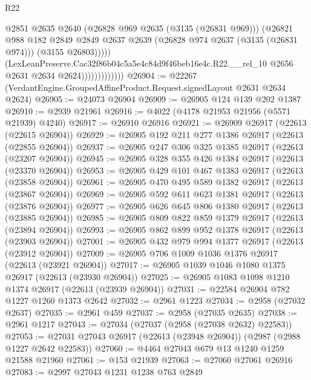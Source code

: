 \begin{lexlean}{R22}
\begin{coremodule}
                                  @2851
                                  @2635
                                  @2640
                                  (@26828 @969 @2635 (@3135 (@26831 @969)))
                                  (@26821
                                    @988
                                    @182
                                    @2849
                                    @2849
                                    @2637
                                    @2639
                                    (@26828 @974 @2637 (@3135 (@26831 @974)))
                                    (@3155 @26803)))))
                            (LexLeanPreserve.Cac32f86b04c5a5e4c84d9f46beb16e4c.R22.__rel_10
                              @2656
                              @2631
                              @2634
                              @2624)))))))))))))
@26904 := @22267 (VerdantEngine.GroupedAffineProduct.Request.signedLayout @2631 @2634 @2624)
@26905 := @24073 @26904
@26909 := @26905 @124 @139 @202 @1387
@26910 := @2939 @21961
@26916 := @4022 (@4178 @21953 @21956 (@5571 @21939) @4240)
@26917 := @26910 @26916
@26921 := @26909 @26917 (@22613 (@22615 @26904))
@26929 := @26905 @192 @211 @277 @1386 @26917 (@22613 (@22855 @26904))
@26937 := @26905 @247 @306 @325 @1385 @26917 (@22613 (@23207 @26904))
@26945 := @26905 @328 @355 @426 @1384 @26917 (@22613 (@23370 @26904))
@26953 := @26905 @429 @101 @467 @1383 @26917 (@22613 (@23858 @26904))
@26961 := @26905 @470 @495 @589 @1382 @26917 (@22613 (@23867 @26904))
@26969 := @26905 @592 @611 @623 @1381 @26917 (@22613 (@23876 @26904))
@26977 := @26905 @626 @645 @806 @1380 @26917 (@22613 (@23885 @26904))
@26985 := @26905 @809 @822 @859 @1379 @26917 (@22613 (@23894 @26904))
@26993 := @26905 @862 @899 @952 @1378 @26917 (@22613 (@23903 @26904))
@27001 := @26905 @432 @979 @994 @1377 @26917 (@22613 (@23912 @26904))
@27009 := @26905 @706 @1009 @1036 @1376 @26917 (@22613 (@23921 @26904))
@27017 := @26905 @1039 @1046 @1080 @1375 @26917 (@22613 (@23930 @26904))
@27025 := @26905 @1083 @1098 @1210 @1374 @26917 (@22613 (@23939 @26904))
@27031 := @22584 @26904 @782 @1227 @1260 @1373 @2642
@27032 := @2961 @1223
@27034 := @2958 (@27032 @2637)
@27035 := @2961 @459
@27037 := @2958 (@27035 @2635)
@27038 := @2961 @1217
@27043 := @27034 (@27037 (@2958 (@27038 @2632) @22583))
@27053 := @27031 @27043 @26917 (@22613 (@23948 @26904)) (@2987 (@2988 @1227 @2642 @22583))
@27060 := @4464 @27043 @679 @13 @1240 @1259 @21588 @21960
@27061 := @153 @21939
@27063 := @27060 @27061 @26916
@27083 := @2997
    @27043
    @1231
    @1238
    @763
    @2849

\end{coremodule}
\end{lexlean}
